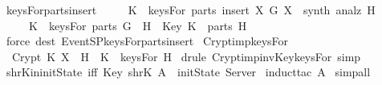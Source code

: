 \begin{isabellebody}
  {\isafoldproof}%
  \isadelimproof
  \isanewline
  \endisadelimproof
  \isanewline
  \isanewline
  \isamarkupfalse%
  \ keysFor{\isacharunderscore}parts{\isacharunderscore}insert\ {\isacharcolon}\ \isanewline
  \ \ {\isachardoublequoteopen}{\isasymlbrakk}\ K\ {\isasymin}\ keysFor\ {\isacharparenleft}parts\ {\isacharparenleft}insert\ X\ G{\isacharparenright}{\isacharparenright}{\isacharsemicolon}\ X\ {\isasymin}\ synth\ {\isacharparenleft}analz\ H{\isacharparenright}\ {\isasymrbrakk}\isanewline
  \ \ \ \ {\isasymLongrightarrow}\ K\ {\isasymin}\ keysFor\ {\isacharparenleft}parts\ {\isacharparenleft}G\ {\isasymunion}\ H{\isacharparenright}{\isacharparenright}\ {\isacharbar}\ Key\ K\ {\isasymin}\ parts\ H{\isachardoublequoteclose}\isanewline
  \isadelimproof
  \endisadelimproof
  \isatagproof
  \isamarkupfalse%
  \ {\isacharparenleft}force\ dest{\isacharcolon}\ EventSP{\isachardot}keysFor{\isacharunderscore}parts{\isacharunderscore}insert{\isacharparenright}%
  \endisatagproof
  {\isafoldproof}%
  \isadelimproof
  \isanewline
  \endisadelimproof
  \isanewline
  \isanewline
  \isamarkupfalse%
  \ Crypt{\isacharunderscore}imp{\isacharunderscore}keysFor\ {\isacharcolon}\ \isanewline
  \ \ {\isachardoublequoteopen}Crypt\ K\ X\ {\isasymin}\ H\ {\isasymLongrightarrow}\ K\ {\isasymin}\ keysFor\ H{\isachardoublequoteclose}\isanewline
  \isadelimproof
  \endisadelimproof
  \isatagproof
  \isamarkupfalse%
  \ {\isacharparenleft}drule\ Crypt{\isacharunderscore}imp{\isacharunderscore}invKey{\isacharunderscore}keysFor{\isacharcomma}\ simp{\isacharparenright}%
  \endisatagproof
  {\isafoldproof}%
  \isadelimproof
  \isanewline
  \endisadelimproof
  \isanewline
  \isanewline
  \isamarkupfalse%
  \ shrK{\isacharunderscore}in{\isacharunderscore}initState\ {\isacharbrackleft}iff{\isacharbrackright}{\isacharcolon}\ {\isachardoublequoteopen}Key\ {\isacharparenleft}shrK\ A{\isacharparenright}\ {\isasymin}\ initState\ Server{\isachardoublequoteclose}\isanewline
  \isadelimproof
  \endisadelimproof
  \isatagproof
  \isamarkupfalse%
  \ {\isacharparenleft}induct{\isacharunderscore}tac\ {\isachardoublequoteopen}A{\isachardoublequoteclose}{\isacharparenright}\isanewline
  \isamarkupfalse%
  \ simp{\isacharunderscore}all\isanewline
  \isamarkupfalse%
  \endisatagproof
  {\isafoldproof}%
  \isadelimproof
  \isanewline
  \endisadelimproof
  \isanewline
  \isanewline
  \isamarkupfalse%

\end{isabellebody}
